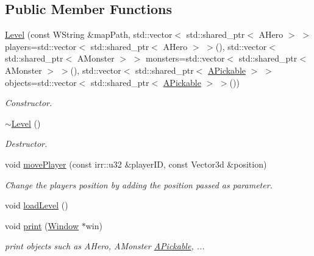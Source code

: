 \subsection*{Public Member Functions}
\begin{DoxyCompactItemize}
\item 
\mbox{\label{classLevel_a1cddef79da66a80002686199a847543f}} 
\hyperlink{classLevel_a1cddef79da66a80002686199a847543f}{Level} (const W\+String \&map\+Path, std\+::vector$<$ std\+::shared\+\_\+ptr$<$ A\+Hero $>$ $>$ players=std\+::vector$<$ std\+::shared\+\_\+ptr$<$ A\+Hero $>$ $>$(), std\+::vector$<$ std\+::shared\+\_\+ptr$<$ A\+Monster $>$ $>$ monsters=std\+::vector$<$ std\+::shared\+\_\+ptr$<$ A\+Monster $>$ $>$(), std\+::vector$<$ std\+::shared\+\_\+ptr$<$ \hyperlink{classAPickable}{A\+Pickable} $>$ $>$ objects=std\+::vector$<$ std\+::shared\+\_\+ptr$<$ \hyperlink{classAPickable}{A\+Pickable} $>$ $>$())
\begin{DoxyCompactList}\small\item\em Constructor. \end{DoxyCompactList}\item 
\mbox{\label{classLevel_a249eac1e8f19ff44134efa5e986feaca}} 
\hyperlink{classLevel_a249eac1e8f19ff44134efa5e986feaca}{$\sim$\+Level} ()
\begin{DoxyCompactList}\small\item\em Destructor. \end{DoxyCompactList}\item 
void \hyperlink{classLevel_ac679a141274c19107c288fe40b967e95}{move\+Player} (const irr\+::u32 \&player\+ID, const Vector3d \&position)
\begin{DoxyCompactList}\small\item\em Change the player\textquotesingle{}s position by adding the position passed as parameter. \end{DoxyCompactList}\item 
void \hyperlink{classLevel_aa88db36cd824320cb599d913603dc2a3}{load\+Level} ()
\item 
void \hyperlink{classLevel_ab8311fe64b7957d627053359331b0b6b}{print} (\hyperlink{classWindow}{Window} $\ast$win)
\begin{DoxyCompactList}\small\item\em print objects such as A\+Hero, A\+Monster \hyperlink{classAPickable}{A\+Pickable}, ... \end{DoxyCompactList}\end{DoxyCompactItemize}


